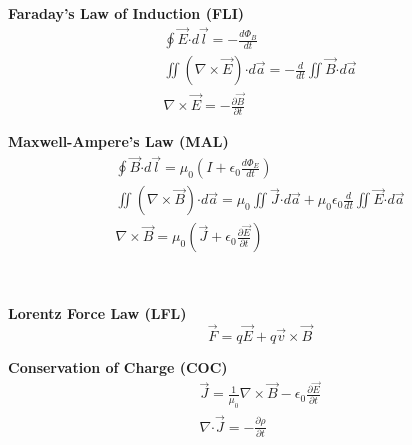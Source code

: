 \documentclass[12pt]{article}
\newcommand*{\dotP}{\boldsymbol \cdot}		%
\begin{document}
\hfill \break \\ \\
\begin{minipage}[t]{0.35\textwidth}
\textbf{Faraday's Law of Induction (FLI)}
\setlength{\jot}{2ex}
\begin{gather*}
	\boxed{ \oint \vec{E} \dotP d\vec{l} = -\frac{d\Phi_B}{dt} }\\
	\iint (\nabla \times \vec{E}) \dotP d\vec{a} = -\frac{d}{dt} \iint \vec{B} \dotP d\vec{a} \\
	\boxed{ \nabla \times \vec{E} = -\frac{\partial \vec{B}}{\partial t} }
\end{gather*}
\end{minipage} 
\hspace{0.15\textwidth}
\begin{minipage}[t]{0.5\textwidth}
\textbf{Maxwell-Ampere's Law (MAL)}
\setlength{\jot}{2ex}
\begin{gather*}
	\boxed{ \oint \vec{B} \dotP d\vec{l} = \mu_0 \left( I + \epsilon_0 \frac{d\Phi_E}{dt} \right) }\\ 
	\iint (\nabla \times \vec{B}) \dotP d\vec{a} = \mu_0 \iint \vec{J} \dotP d\vec{a}
		+ \mu_0\epsilon_0\frac{d}{dt} \iint \vec{E} \dotP d\vec{a}\\
	\boxed{ \nabla \times \vec{B} = \mu_0 \left( \vec{J} 
		+ \epsilon_0 \frac{\partial \vec{E}}{\partial t} \right) }
\end{gather*} 
\end{minipage} 

\hfill \break \\
\begin{minipage}[t]{0.35\textwidth}
\textbf{Lorentz Force Law (LFL)}
\[ \boxed{ \vec{F} = q\vec{E} + q \vec{v} \times \vec{B} } \]
\end{minipage}
\hspace{0.15\textwidth}
\begin{minipage}[t]{0.35\textwidth}
\textbf{Conservation of Charge (COC)}
\setlength{\jot}{2ex}
\begin{gather*} 
	\vec{J} = \frac{1}{\mu_0} \nabla \times \vec{B} - \epsilon_0 \frac{\partial \vec{E}}{\partial t} \\
	\boxed{ \nabla \dotP \vec{J} = - \frac{\partial \rho}{\partial t} }
\end{gather*}
\end{minipage}

\newpage
\end{document}
